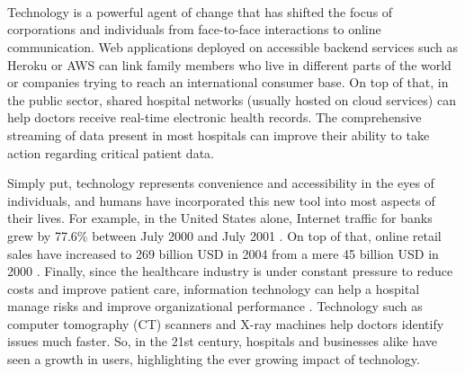 \section*{\color{SectionBlue}{Background Information}} \label{sec:sections}
\subsection*{\color{SubSectionBlue}{A Technological World}}
 \\
Technology is a powerful agent of change that has shifted the focus of corporations and individuals from face-to-face interactions to online communication. Web applications deployed on accessible backend services such as Heroku or AWS can link family members who live in different parts of the world or companies trying to reach an international consumer base. On top of that, in the public sector, shared hospital networks (usually hosted on cloud services) can help doctors receive real-time electronic health records. The comprehensive streaming of data present in most hospitals can improve their ability to take action regarding critical patient data. 

\vspace{1mm}

Simply put, technology represents convenience and accessibility in the eyes of individuals, and humans have incorporated this new tool into most aspects of their lives. For example, in the United States alone, Internet traffic for banks grew by 77.6\% between July 2000 and July 2001 \cite{mia_e-banking_2007}. On top of that, online retail sales have increased to 269 billion USD in 2004 from a mere 45 billion USD in 2000 \cite{rohm_typology_2004}. Finally, since the healthcare industry is under constant pressure to reduce costs and improve patient care, information technology can help a hospital manage risks and improve organizational performance \cite{bradley_empirical_2012}. Technology such as computer tomography (CT) scanners and X-ray machines help doctors identify issues much faster. So, in the 21st century, hospitals and businesses alike have seen a growth in users, highlighting the ever growing impact of technology.

\subsection*{\color{SubSectionBlue}{The Dangers of Cyberspace}}
 \\

